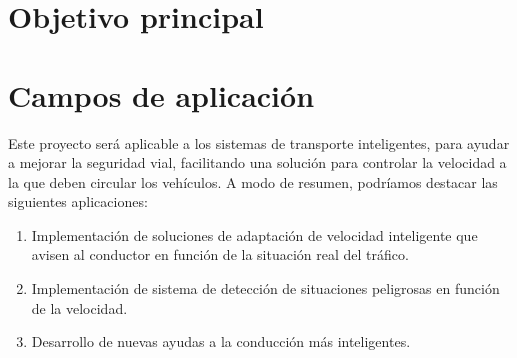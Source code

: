 \section{Objetivo principal}



\section{Campos de aplicación}


Este proyecto será aplicable a los sistemas de transporte inteligentes, para ayudar a mejorar la seguridad vial, facilitando una solución para controlar la velocidad a la que deben circular los vehículos. A modo de resumen, podríamos destacar las siguientes aplicaciones:
\begin{enumerate}	
	\item Implementación de soluciones de adaptación de velocidad inteligente que avisen al conductor en función de la situación real del tráfico.
	\item Implementación de sistema de detección de situaciones peligrosas en función de la velocidad.
	\item Desarrollo de nuevas ayudas a la conducción más inteligentes.
\end{enumerate}



